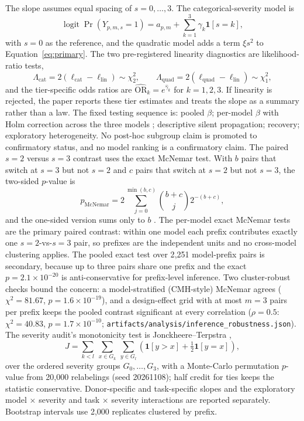 \documentclass[a4paper,fleqn]{cas-sc}
\begin{document}
The slope assumes equal spacing of $s=0,\dots,3$. The categorical-severity model is
\begin{equation}
  \operatorname{logit}\Pr(Y_{p,m,s}=1)
  =a_{p,m}+\sum_{k=1}^{3}\gamma_k\mathbf{1}[s=k],
  \label{eq:categorical}
\end{equation}
with $s=0$ as the reference, and the quadratic model adds a term $\xi s^2$ to
Equation~\ref{eq:primary}. The two pre-registered linearity diagnostics are likelihood-ratio
tests,
\begin{equation}
  \Lambda_{\mathrm{cat}}=2(\ell_{\mathrm{cat}}-\ell_{\mathrm{lin}})\sim\chi^{2}_{2},
  \qquad
  \Lambda_{\mathrm{quad}}=2(\ell_{\mathrm{quad}}-\ell_{\mathrm{lin}})\sim\chi^{2}_{1},
  \label{eq:lrt}
\end{equation}
and the tier-specific odds ratios are $\widehat{\mathrm{OR}}_k=e^{\hat\gamma_k}$ for
$k=1,2,3$. If linearity is rejected, the paper reports these tier estimates and treats the slope
as a summary rather than a law. The fixed testing sequence is: pooled $\beta$; per-model $\beta$
with Holm correction across the three models \cite{holm1979}; descriptive silent propagation;
recovery; exploratory heterogeneity. No post-hoc subgroup claim is promoted to confirmatory
status, and no model ranking is a confirmatory claim. The paired $s=2$ versus $s=3$ contrast uses
the exact McNemar test. With $b$ pairs that switch at $s=3$ but not $s=2$ and $c$ pairs that
switch at $s=2$ but not $s=3$, the two-sided $p$-value is
\begin{equation}
  p_{\mathrm{McNemar}}=
  2\sum_{j=0}^{\min(b,c)}\binom{b+c}{j}2^{-(b+c)},
  \label{eq:mcnemar}
\end{equation}
and the one-sided version sums only to $b$ \cite{mcnemar1947}. The per-model
exact McNemar tests are the primary paired contrast: within one model each prefix contributes
exactly one $s=2$-vs-$s=3$ pair, so prefixes are the independent units and no cross-model
clustering applies. The pooled exact test over 2{,}251 model-prefix pairs is secondary, because
up to three pairs share one prefix and the exact $p=2.1\times10^{-20}$ is anti-conservative for
prefix-level inference. Two cluster-robust checks bound the concern: a model-stratified
(CMH-style) McNemar agrees ($\chi^2=81.67$, $p=1.6\times10^{-19}$), and a design-effect grid
with at most $m=3$ pairs per prefix keeps the pooled contrast significant at every correlation
($\rho=0.5$: $\chi^2=40.83$, $p=1.7\times10^{-10}$;
\texttt{artifacts/analysis/inference\_robustness.json}). The severity audit's monotonicity
test is Jonckheere--Terpstra \cite{jonckheere1954},
\begin{equation}
  J=\sum_{k<l}\ \sum_{x\in G_k}\ \sum_{y\in G_l}
  \left(\mathbf{1}[y>x]+\tfrac12\mathbf{1}[y=x]\right),
  \label{eq:jt}
\end{equation}
over the ordered severity groups $G_0,\dots,G_3$, with a Monte-Carlo permutation $p$-value from
20{,}000 relabelings (seed 20261108); half credit for ties keeps the statistic conservative.
Donor-specific and task-specific slopes and the exploratory model $\times$ severity and task
$\times$ severity interactions are reported separately. Bootstrap intervals use 2{,}000
replicates clustered by prefix.
\end{document}

